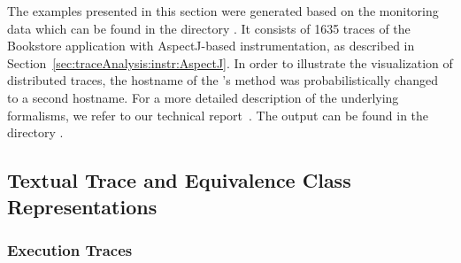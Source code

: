 \newcommand{\OPT}[1]{\texttt{#1}}
\newcommand{\OPTprintValidExecutionTraces}{-\,-print-Execution-Traces}
\newcommand{\OPTprintInvalidExecutionTraces}{-\,-print-invalid-Execution-Traces}
\newcommand{\OPTprintMessageTraces}{-\,-print-Message-Traces}
\newcommand{\OPTprintDeploymentEquivalenceClasses}{-\,-print-Deployment-Equivalence-Classes}
\newcommand{\OPTprintAssemblyEquivalenceClasses}{-\,-print-Assembly-Equivalence-Classes}
\newcommand{\OPTplotDeploymentSequenceDiagrams}{-\,-plot-Deployment-Sequence-Diagrams}
\newcommand{\OPTplotAssemblySequenceDiagrams}{-\,-plot-Assembly-Sequence-Diagrams}
\newcommand{\OPTplotCallTrees}{-\,-plot-Call-Trees}
\newcommand{\OPTplotAggregatedDeploymentCallTree}{-\,-plot-Aggregated-Deployment-Call-Tree}
\newcommand{\OPTplotAggregatedAssemblyCallTree}{-\,-plot-Aggregated-Assembly-Call-Tree}

\newcommand{\OPTplotContainerDependencyGraph}{-\,-plot-Container-Dependency-Graph}
\newcommand{\OPTplotDeploymentComponentDependencyGraph}{-\,-plot-Deployment-Component-Dependency-Graph}
\newcommand{\OPTplotAssemblyComponentDependencyGraph}{-\,-plot-Assembly-Component-Dependency-Graph}
\newcommand{\OPTplotDeploymentOperationDependencyGraph}{-\,-plot-Deployment-Operation-Dependency-Graph}
\newcommand{\OPTplotAssemblyOperationDependencyGraph}{-\,-plot-Assembly-Operation-Dependency-Graph}

The examples presented in this section were generated based on the %
monitoring data which can be found in the directory %
\dir{\distributedTestdataReleaseDirDistro/}. It consists of 1635 traces %
of the Bookstore application with AspectJ-based instrumentation, %
as described in Section~\ref{sec:traceAnalysis:instr:AspectJ}. %
In order to illustrate the visualization of distributed traces, %
the hostname of the 's method  was %
probabilistically changed to a second hostname. %
For a more detailed description of the underlying formalisms, %
we refer to our technical report~\cite{vanHoornRohrHasselbringWallerEhlersFreyKieselhorst2009TRContinuousMonitoringOfSoftwareServicesDesignAndApplicationOfTheKiekerFramework}. %
The output can be found in the directory %
.

\subsection{Textual Trace and Equivalence Class Representations}

\subsubsection{Execution Traces}\label{sec:example:executionTraces}%

